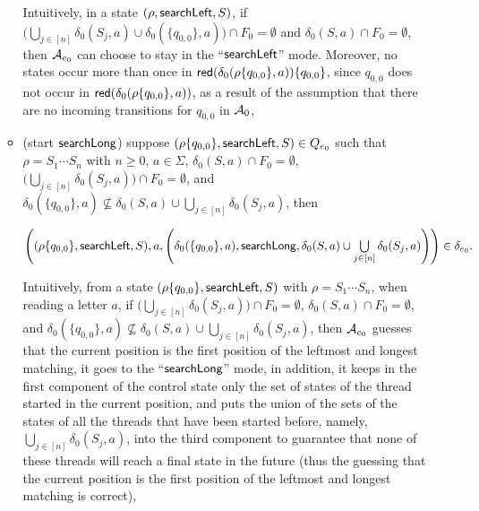 \begin{itemize}
\begin{itemize}
		\medskip
		 
		Intuitively, in a state $(\rho, \mathsf{searchLeft}, S)$, if $\big(\bigcup \limits_{j \in [n]} \delta_0(S_j, a) \cup \delta_0(\{q_{0,0}\},a)\big) \cap F_0 = \emptyset$ and $\delta_0(S,a) \cap F_0 = \emptyset$, then $\mathcal{A}_{e_0}$ can choose to stay in the ``$\mathsf{searchLeft}$'' mode. 
		Moreover, no states occur more than once in $\mathsf{red}(\delta_0(\rho \{q_{0,0}\}, a)) \{q_{0,0}\}$, since $q_{0,0}$ does not occur in $\mathsf{red}(\delta_0(\rho\{q_{0,0}\}, a))$, as a result of the assumption that there are no incoming transitions for $q_{0,0}$ in $\mathcal{A}_0$,
		\item (start $\mathsf{searchLong}$) suppose $(\rho \{q_{0,0}\}, \mathsf{searchLeft}, S) \in Q_{e_0}$ such that $\rho = S_1 \cdots S_n$ with $n \ge 0$, $a \in \Sigma$, $\delta_0(S,a) \cap F_0 = \emptyset$, $\big(\bigcup \limits_{j \in [n]} \delta_0(S_j, a) \big) \cap F_0 = \emptyset$,  and $\delta_0(\{q_{0,0}\}, a) \not \subseteq \delta_0(S, a) \cup \bigcup \limits_{j \in [n]} \delta_0(S_j, a)$, then
		
		\medskip
		$\left((\rho \{q_{0,0}\}, \mathsf{searchLeft}, S), a, \left(\delta_0(\{q_{0,0}\}, a), \mathsf{searchLong}, \delta_0(S, a) \cup \bigcup \limits_{j \in [n]} \delta_0(S_j, a) \right) \right) \in \delta_{e_0}.$
		
		\medskip
		Intuitively, from a state $(\rho \{q_{0,0}\}, \mathsf{searchLeft}, S)$ with $\rho = S_1 \cdots S_n$, when reading a letter $a$, if $\big(\bigcup \limits_{j \in [n]} \delta_0(S_j, a) \big) \cap F_0 = \emptyset$, $\delta_0(S,a) \cap F_0 = \emptyset$, and $\delta_0(\{q_{0,0}\}, a) \not \subseteq \delta_0(S, a) \cup \bigcup \limits_{j \in [n]} \delta_0(S_j, a)$, then $\mathcal{A}_{e_0}$ guesses that the current position is the first position of the leftmost and longest matching, it goes to the ``$\mathsf{searchLong}$'' mode, in addition, it keeps in the first component of the control state only the set of states of the thread started in the current position, and puts the union of the sets of the states of all the threads that have been started before, namely, $\bigcup \limits_{j \in [n]} \delta_0(S_j, a)$, into the third component to guarantee that none of these threads will reach a final state in the future (thus the guessing that the current position is the first position of the leftmost and longest matching is correct),



\end{itemize}
\end{itemize}
